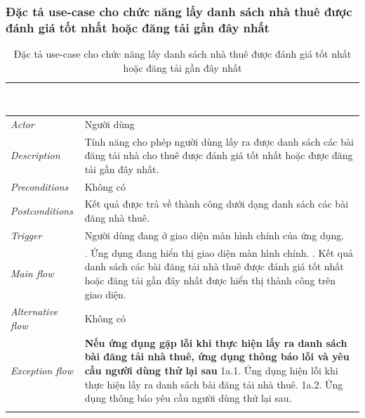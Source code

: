 \subsubsection{Đặc tả use-case cho chức năng lấy danh sách nhà thuê được đánh giá tốt nhất hoặc đăng tải gần đây nhất}
\begin{center}
    \arrayrulewidth=2pt
    \begin{longtable}{
        |>{\raggedright\arraybackslash}p{3cm}
        |>{\raggedright\arraybackslash}p{13cm}
        |}
        \hline
        \rowcolor{cyan!75!black} \textcolor{white}{\textbf{Use-case name}} & \textcolor{white}{\textbf{LẤY DANH SÁCH NHÀ THUÊ ĐƯỢC ĐÁNH GIÁ TỐT NHẤT HOẶC ĐĂNG TẢI GẦN ĐÂY NHẤT}}
        \\\hline
        \rowcolor{cyan!10!white} \textit{Actor} & Người dùng
        \\\hdashline
        \rowcolor{cyan!10!white} \textit{Description} & Tính năng cho phép người dùng lấy ra được danh sách các bài đăng tải nhà cho thuê được đánh giá tốt nhất hoặc được đăng tải gần đây nhất.
        \\\hdashline
        \rowcolor{cyan!10!white} \textit{Preconditions} & Không có
        \\\hdashline
        \rowcolor{cyan!10!white} \textit{Postconditions} & Kết quả được trả về thành công dưới dạng danh sách các bài đăng nhà thuê.
        \\\hdashline
        \rowcolor{cyan!10!white} \textit{Trigger} & Người dùng đang ở giao diện màn hình chính của ứng dụng.
        \\\hdashline
        \rowcolor{cyan!10!white} \textit{Main flow} &
        1. Ứng dụng đang hiển thị giao diện màn hình chính. \newline
        3. Kết quả danh sách các bài đăng tải nhà thuê được đánh giá tốt nhất hoặc đăng tải gần đây nhất được hiển thị thành công trên giao diện.
        \\\hdashline
        \rowcolor{cyan!10!white} \textit{Alternative flow} & Không có
        \\\hdashline
        \rowcolor{cyan!10!white} \textit{Exception flow} &
        \textbf{Nếu ứng dụng gặp lỗi khi thực hiện lấy ra danh sách bài đăng tải nhà thuê, ứng dụng thông báo lỗi và yêu cầu người dùng thử lại sau} \newline
        1a.1. Ứng dụng hiện lỗi khi thực hiện lấy ra danh sách bài đăng tải nhà thuê. \newline
        1a.2. Ứng dụng thông báo yêu cầu người dùng thử lại sau.
        \\\hline
        \caption{Đặc tả use-case cho chức năng lấy danh sách nhà thuê được đánh giá tốt nhất hoặc đăng tải gần đây nhất}
    \end{longtable}
\end{center}

